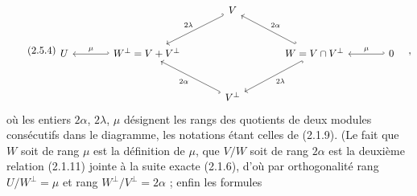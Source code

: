 \begin{equation}\tag{2.5.4}
\begin{tikzcd}[column sep=large, row sep=large]
& & V \arrow[dl, hook', "2\lambda"'] & & \\
U & W^{\perp} = V + V^{\perp} \arrow[l, hook', "\mu"'] & & W = V \cap V^{\perp} \arrow[ul, hook', "2\alpha"'] \arrow[dl, hook, "2\lambda"] & 0 \arrow[l, hook', "\mu"'] \\
& & V^{\perp} \arrow[ul, hook, "2\alpha"] & &
\end{tikzcd} \quad ,
\end{equation}
où les entiers $2\alpha$, $2\lambda$, $\mu$ désignent les rangs des quotients de deux modules consécutifs dans le diagramme, les notations étant celles de (2.1.9). (Le fait que $W$ soit de rang $\mu$ est la définition de $\mu$, que $V/W$ soit de rang $2\alpha$ est la deuxième relation (2.1.11) jointe à la suite exacte (2.1.6), d'où par orthogonalité rang $U/W^{\perp} = \mu$ et rang $W^{\perp}/V^{\perp} = 2\alpha$ ; enfin les formules

